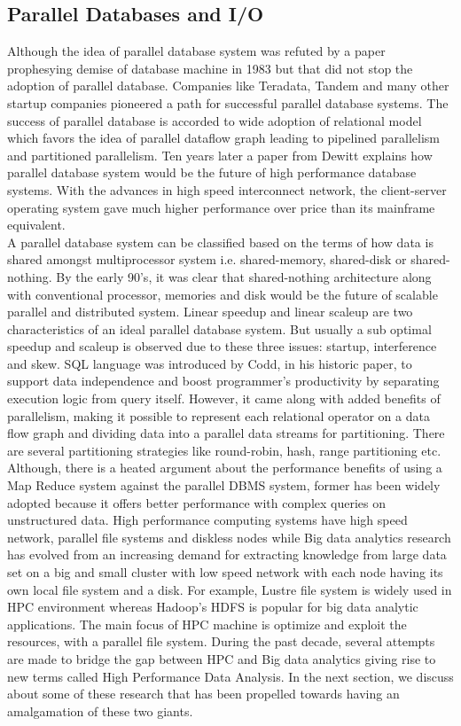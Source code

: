 \documentclass[runningheads,a4paper]{llncs}
\begin{document}
{%
\subsection{Parallel Databases and I/O}
Although the idea of parallel database system was refuted by a paper prophesying demise of database machine in 1983 but that did not stop the adoption of parallel database. Companies like Teradata, Tandem and many other startup companies pioneered a path for successful parallel database systems. The success of parallel database is accorded to wide adoption of relational model which favors the idea of parallel dataflow graph leading to pipelined parallelism and partitioned parallelism. Ten years later a paper from Dewitt explains how parallel database system would be the future of high performance database systems. With the advances in high speed interconnect network, the client-server operating system gave much higher performance over price than its mainframe equivalent.\\

A parallel database system can be classified based on the terms of how data is shared amongst multiprocessor system i.e. shared-memory, shared-disk or shared-nothing. By the early 90's, it was clear that shared-nothing architecture along with conventional processor, memories and disk would be the future of scalable parallel and distributed system. Linear speedup and linear scaleup are two characteristics of an ideal parallel database system. But usually a sub optimal speedup and scaleup is observed due to these three issues: startup, interference and skew. SQL language was introduced by Codd, in his historic paper, to support data independence and boost programmer's productivity by separating execution logic from query itself. However, it came along with added benefits of parallelism, making it possible to represent each relational operator on a data flow graph and dividing data into a parallel data streams for partitioning. There are several partitioning strategies like round-robin, hash, range partitioning etc. \\

Although, there is a heated argument about the performance benefits of using a Map Reduce system against the parallel DBMS system, former has been widely adopted because it offers better performance with complex queries on unstructured data. High performance computing systems have high speed network, parallel file systems and diskless nodes while Big data analytics research has evolved from an increasing demand for extracting knowledge from large data set on a big and small cluster with low speed network with each node having its own local file system and a disk. For example, Lustre file system is widely used in HPC environment whereas Hadoop's HDFS is popular for big data analytic applications. The main focus of HPC machine is optimize and exploit the resources, with a parallel file system. During the past decade, several attempts are made to bridge the gap between HPC and Big data analytics giving rise to new terms called High Performance Data Analysis. In the next section, we discuss about some of these research that has been propelled towards having an amalgamation of these two giants.\\

}
\end{document}
